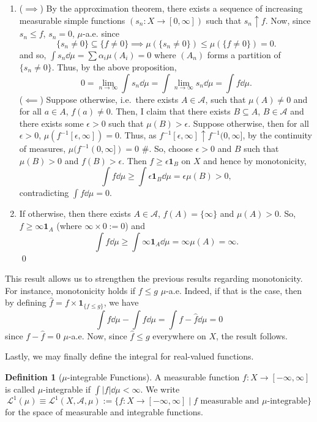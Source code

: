 \documentclass[
]{article}
\theoremstyle{definition}
\theoremstyle{definition}
\newtheorem{definition}{Definition}[section]
\begin{document}
\begin{enumerate}
\def\labelenumi{(\arabic{enumi})}
\item
  (\(\implies\)) By the approximation theorem, there exists a sequence
  of increasing measurable simple functions
  \((s_n : X \to [0, \infty])\) such that \(s_n \uparrow f\). Now, since
  \(s_n \le f\), \(s_n = 0\), \(\mu\)-a.e. since
  \[\{s_n \neq 0\} \subseteq \{f \neq 0\} \implies \mu(\{s_n \neq 0\}) 
      \le \mu(\{f \neq 0\}) = 0.\] and so,
  \(\int s_n \dd \mu = \sum \alpha_i \mu(A_i) = 0\) where \((A_n)\)
  forms a partition of \(\{s_n \neq 0\}\). Thus, by the above
  proposition,
  \[0 = \lim_{n \to \infty} \int s_n \dd \mu = \int \lim_{n \to \infty} s_n \dd \mu = 
      \int f \dd \mu.\] (\(\impliedby\)) Suppose otherwise, i.e.~there
  exists \(A \in \mathcal{A}\), such that \(\mu(A) \neq 0\) and for all
  \(a \in A\), \(f(a) \neq 0\). Then, I claim that there exists
  \(B \subseteq A\), \(B \in \mathcal{A}\) and there exists some
  \(\epsilon > 0\) such that \(\mu(B) > \epsilon\). Suppose otherwise,
  then for all \(\epsilon > 0\), \(\mu(f^{-1}[\epsilon, \infty]) = 0\).
  Thus, as \(f^{-1}[\epsilon, \infty] \uparrow f^{-1}(0, \infty]\), by
  the continuity of measures, \(\mu(f^{-1}(0, \infty]) = 0\) \#. So,
  choose \(\epsilon >0\) and \(B\) such that \(\mu(B) > 0\) and
  \(f(B) > \epsilon\). Then \(f \ge \epsilon\mathbf{1}_B\) on \(X\) and
  hence by monotonicity,
  \[\int f \dd \mu \ge \int \epsilon\mathbf{1}_B \dd \mu = \epsilon \mu(B) > 0,\]
  contradicting \(\int f \dd \mu = 0\).
\item
  If otherwise, then there exists \(A \in \mathcal{A}\),
  \(f(A) = \{\infty\}\) and \(\mu(A) > 0\). So,
  \(f \ge \infty \mathbf{1}_A\) (where \(\infty \times 0 := 0\)) and
  \[\int f \dd \mu \ge \int \infty \mathbf{1}_A \dd \mu = \infty \mu(A) = \infty.\]
  \qed
\end{enumerate}

This result allows us to strengthen the previous results regarding
monotonicity. For instance, monotonicity holds if \(f \le g\)
\(\mu\)-a.e. Indeed, if that is the case, then by defining
\(\hat f = f \times \mathbf{1}_{\{f \le g\}}\), we have
\[\int f \dd \mu - \int \hat f \dd \mu = \int f - \hat f \dd \mu = 0\]
since \(f - \hat f = 0\) \(\mu\)-a.e. Now, since \(\hat f \le g\)
everywhere on \(X\), the result follows.

Lastly, we may finally define the integral for real-valued functions.

\begin{definition}[\(\mu\)-integrable Functions]
  A measurable function \(f : X \to [-\infty, \infty]\) is called \(\mu\)-integrable 
  if \(\int |f| \dd \mu < \infty\). We write 
  \[\mathcal{L}^1(\mu) \equiv \mathcal{L}^1(X, \mathcal{A}, \mu) 
    := \{f : X \to [-\infty, \infty] \mid f \text{ measurable and } \mu \text{-integrable}\}\]
  for the space of measurable and integrable functions.
\end{definition}
\end{document}
